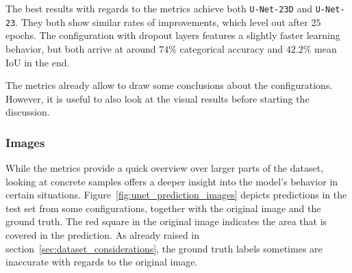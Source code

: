 The best results with regards to the metrics achieve both \texttt{U-Net-23D} and \texttt{U-Net-23}. They both show similar rates of improvements, which level out after $25$ epochs. The configuration with dropout layers features a slightly faster learning behavior, but both arrive at around $74\%$ categorical accuracy and $42.2\%$ mean IoU in the end.

The metrics already allow to draw some conclusions about the configurations. However, it is useful to also look at the visual results before starting the discussion.

\subsubsection{Images}
While the metrics provide a quick overview over larger parts of the dataset, looking at concrete samples offers a deeper insight into the model's behavior in certain situations. Figure~\ref{fig:unet_prediction_images} depicts predictions in the test set from some configurations, together with the original image and the ground truth. The red square in the original image indicates the area that is covered in the prediction. As already raised in section~\ref{sec:dataset_considerations}, the ground truth labels sometimes are inaccurate with regards to the original image.

